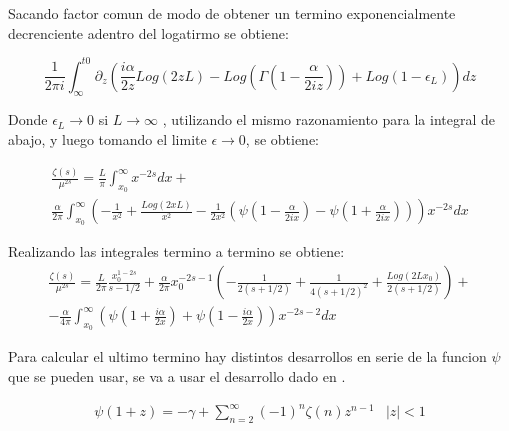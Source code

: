 Sacando factor comun de modo de obtener un termino exponencialmente decrenciente adentro del logatirmo se obtiene:

\begin{equation}
\frac{ 1 }{2 \pi i}  \int _{\infty} ^{t0} 
\partial _{z}
\left(
\frac{i\alpha}{2 z} Log ( 2 z L ) - 
Log \left( \Gamma \left( 1 - \frac{ \alpha}{2 i z} \right) \right) +
Log \left( 1- \epsilon _L \right)
\right)
d z
\end{equation}

Donde $ \epsilon _L \rightarrow 0$ si $L \rightarrow \infty $ , utilizando el mismo razonamiento para la integral de abajo, y luego tomando el limite $\epsilon \rightarrow 0$, se obtiene:

\begin{equation}
\begin{array}{c}
\frac{\zeta (s)}{\mu ^{2s}} = 
\frac{L }{\pi}
\int _ {x_0} ^{\infty} x ^{-2s} dx + \\[10pt]
\frac{\alpha }{2 \pi } \int _{x_0} ^{\infty} 
\left(-
\frac{1}{ x ^2} +
\frac{Log \left( 2 x L \right) }{x ^2}  -
\frac{1}{ 2 x ^2 } 
\left(
\psi (1 - \frac{ \alpha}{2 i x}) - \psi (1 + \frac{ \alpha}{2 i x}) 
\right)
\right)
x ^{-2s} d x
\end{array}
\end{equation}



Realizando las integrales termino a termino se obtiene:
\begin{equation}
\begin{array}{c}
\frac{\zeta (s)}{\mu ^{2s}} = 


\frac{L  }{2 \pi} \frac{x _0 ^{1-2s}}{s-1/2} + 


\frac{\alpha  }{2 \pi} x _{0} ^{-2s-1}
\left( 
	-\frac{1}{2(s+1/2)} +
	\frac{1}{4 (s+1/2) ^2} +
	\frac{Log(2 L x _0)}{2(s+1/2)} 
	\right) + 

  \\[10pt]


- \frac{\alpha  }{4 \pi}
\int _{x_0} ^{\infty} 
\left(
\psi(1 + \frac{i \alpha}{2 x}) +
\psi(1 - \frac{i \alpha}{2 x} )
\right)
x ^{-2s-2}
dx
\end{array}
\end{equation}


Para calcular el ultimo termino hay distintos desarrollos en serie de la funcion $\psi $ que se pueden usar, se va a usar el desarrollo dado en \cite{Abramowitz:1974:HMF:1098650}.

\begin{equation}
\begin{array}{cc}
\psi (1+ z ) = - \gamma + \sum _{n=2} ^{\infty} (-1) ^n \zeta (n) z ^{n-1} & |z| < 1
\end{array}
\label{repr}
\end{equation}


